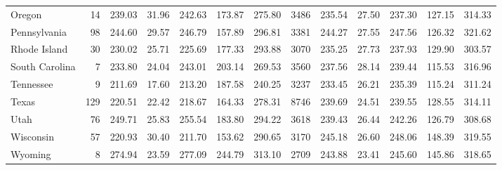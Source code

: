 \begin{sidewaystable}[htb]
\begin{center}
{\begin{tabular}{lrrrrrr@{\extracolsep{10pt}}rrrrrr}
  Oregon &  14 & 239.03 & 31.96 & 242.63 & 173.87 & 275.80 & 3486 & 235.54 & 27.50 & 237.30 & 127.15 & 314.33 \\ 
  Pennsylvania &  98 & 244.60 & 29.57 & 246.79 & 157.89 & 296.81 & 3381 & 244.27 & 27.55 & 247.56 & 126.32 & 321.62 \\ 
  Rhode Island &  30 & 230.02 & 25.71 & 225.69 & 177.33 & 293.88 & 3070 & 235.25 & 27.73 & 237.93 & 129.90 & 303.57 \\ 
  South Carolina &   7 & 233.80 & 24.04 & 243.01 & 203.14 & 269.53 & 3560 & 237.56 & 28.14 & 239.44 & 115.53 & 316.96 \\ 
  Tennessee &   9 & 211.69 & 17.60 & 213.20 & 187.58 & 240.25 & 3237 & 233.45 & 26.21 & 235.39 & 115.24 & 311.24 \\ 
  Texas & 129 & 220.51 & 22.42 & 218.67 & 164.33 & 278.31 & 8746 & 239.69 & 24.51 & 239.55 & 128.55 & 314.11 \\ 
  Utah &  76 & 249.71 & 25.83 & 255.54 & 183.80 & 294.22 & 3618 & 239.43 & 26.44 & 242.26 & 126.79 & 308.68 \\ 
  Wisconsin &  57 & 220.93 & 30.40 & 211.70 & 153.62 & 290.65 & 3170 & 245.18 & 26.60 & 248.06 & 148.39 & 319.55 \\ 
  Wyoming &   8 & 274.94 & 23.59 & 277.09 & 244.79 & 313.10 & 2709 & 243.88 & 23.41 & 245.60 & 145.86 & 318.65 \\ 
   \hline
\end{tabular}
}
\end{center}
\end{sidewaystable}
